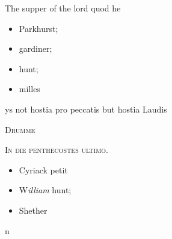 \documentclass[12pt, a4paper]{book}
\begin{document}
		\ifthenelse{\isodd{\thepage}}
		{\reversemarginpar}
		{\normalmarginpar}
		The supper of the lord quod he
               	
               	
               	
               		
               			\begin{itemize}
               				\item[]Parkhurst;
               				\item[]gardiner;
               				\item[]hunt;
               				\item[]milles
               			\end{itemize}
               			
			
               		
		\ifthenelse{\isodd{\thepage}}
		{\reversemarginpar}
		{\normalmarginpar}
		ys not hostia pro peccatis but hostia Laudis
               	
 

            
            
               
				\begin{center} \begin{large} {\scshape Drumme
			} \end{large} \end{center}
			
               
                  
				\begin{center}  {\scshape In die penthecostes ultimo.}  \end{center}
			
               	
               		
               			\begin{itemize}
               				\item[]Cyriack petit
               				\item[]W\textit{illiam} hunt;
               				\item[]Shether
               			\end{itemize}
               			
               			n
			
\end{document}
